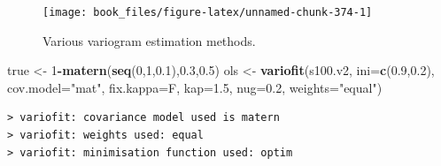 \documentclass[b5paper,]{scrbook}
\makeatletter
\newenvironment{Shaded}{\begin{snugshade}}{\end{snugshade}}
\newcommand{\DataTypeTok}[1]{\textcolor[rgb]{0.13,0.29,0.53}{#1}}
\newcommand{\DecValTok}[1]{\textcolor[rgb]{0.00,0.00,0.81}{#1}}
\newcommand{\FloatTok}[1]{\textcolor[rgb]{0.00,0.00,0.81}{#1}}
\newcommand{\KeywordTok}[1]{\textcolor[rgb]{0.13,0.29,0.53}{\textbf{#1}}}
\newcommand{\NormalTok}[1]{#1}
\newcommand{\OperatorTok}[1]{\textcolor[rgb]{0.81,0.36,0.00}{\textbf{#1}}}
\newcommand{\StringTok}[1]{\textcolor[rgb]{0.31,0.60,0.02}{#1}}
\theoremstyle{plain}
\theoremstyle{definition}
\numberwithin{equation}{section}
\newenvironment{kframe}{%
\medskip{}
\setlength{\fboxsep}{.8em}
 \def\at@end@of@kframe{}%
 \ifinner\ifhmode%
  \def\at@end@of@kframe{\end{minipage}}%
  \begin{minipage}{\columnwidth}%
 \fi\fi%
 \def\FrameCommand##1{\hskip\@totalleftmargin \hskip-\fboxsep
 \colorbox{shadecolor}{##1}\hskip-\fboxsep
     \hskip-\linewidth \hskip-\@totalleftmargin \hskip\columnwidth}%
 \MakeFramed {\advance\hsize-\width
   \@totalleftmargin\z@ \linewidth\hsize
   \@setminipage}}%
 {\par\unskip\endMakeFramed%
 \at@end@of@kframe}
\renewenvironment{Shaded}{\begin{kframe}}{\end{kframe}}
\makeatother
\begin{document}
\begin{Shaded}
\end{Shaded}

\begin{figure}

{\centering \texttt{[image: book\_files/figure-latex/unnamed-chunk-374-1]} 

}

\caption{Various variogram estimation methods.}\label{fig:unnamed-chunk-374}
\end{figure}

\begin{Shaded}
\begin{Highlighting}[]
\NormalTok{true <-}\StringTok{ }\DecValTok{1}\OperatorTok{-}\KeywordTok{matern}\NormalTok{(}\KeywordTok{seq}\NormalTok{(}\DecValTok{0}\NormalTok{,}\DecValTok{1}\NormalTok{,}\FloatTok{0.1}\NormalTok{),}\FloatTok{0.3}\NormalTok{,}\FloatTok{0.5}\NormalTok{)}
\NormalTok{ols <-}\StringTok{ }\KeywordTok{variofit}\NormalTok{(s100.v2, }\DataTypeTok{ini=}\KeywordTok{c}\NormalTok{(}\FloatTok{0.9}\NormalTok{,}\FloatTok{0.2}\NormalTok{), }\DataTypeTok{cov.model=}\StringTok{"mat"}\NormalTok{,}
                \DataTypeTok{fix.kappa=}\NormalTok{F, }\DataTypeTok{kap=}\FloatTok{1.5}\NormalTok{, }\DataTypeTok{nug=}\FloatTok{0.2}\NormalTok{, }\DataTypeTok{weights=}\StringTok{"equal"}\NormalTok{)}
\end{Highlighting}
\end{Shaded}

\begin{verbatim}
> variofit: covariance model used is matern 
> variofit: weights used: equal 
> variofit: minimisation function used: optim
\end{verbatim}
\end{document}
